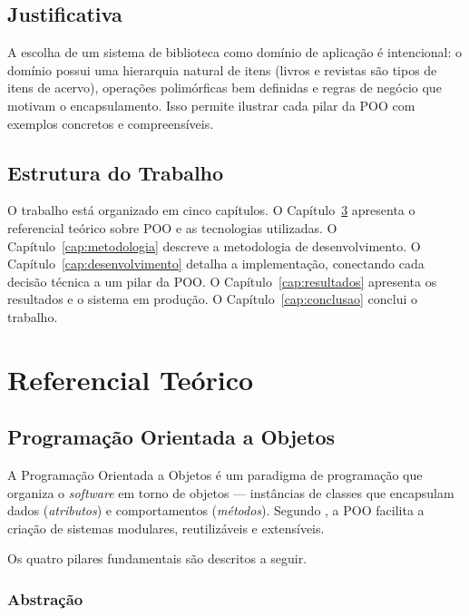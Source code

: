 \documentclass[
  12pt,
  a4paper,
  oneside,
  brazil
]{abntex2}
\begin{document}
\section{Justificativa}

A escolha de um sistema de biblioteca como domínio de aplicação é intencional: o domínio possui uma hierarquia natural de itens (livros e revistas são tipos de itens de acervo), operações polimórficas bem definidas e regras de negócio que motivam o encapsulamento. Isso permite ilustrar cada pilar da POO com exemplos concretos e compreensíveis.

\section{Estrutura do Trabalho}

O trabalho está organizado em cinco capítulos. O Capítulo~\ref{cap:referencial} apresenta o referencial teórico sobre POO e as tecnologias utilizadas. O Capítulo~\ref{cap:metodologia} descreve a metodologia de desenvolvimento. O Capítulo~\ref{cap:desenvolvimento} detalha a implementação, conectando cada decisão técnica a um pilar da POO. O Capítulo~\ref{cap:resultados} apresenta os resultados e o sistema em produção. O Capítulo~\ref{cap:conclusao} conclui o trabalho.

\chapter{Referencial Teórico}
\label{cap:referencial}

\section{Programação Orientada a Objetos}

A Programação Orientada a Objetos é um paradigma de programação que organiza o \textit{software} em torno de objetos — instâncias de classes que encapsulam dados (\textit{atributos}) e comportamentos (\textit{métodos}). Segundo , a POO facilita a criação de sistemas modulares, reutilizáveis e extensíveis.

Os quatro pilares fundamentais são descritos a seguir.

\subsection{Abstração}
\end{document}
